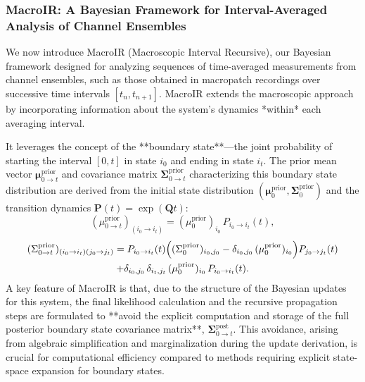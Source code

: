 \documentclass[9pt]{elife}
\begin{document}
	\subsubsection{MacroIR: A Bayesian Framework for Interval-Averaged Analysis of Channel Ensembles}
	
	We now introduce MacroIR (Macroscopic Interval Recursive), our Bayesian framework designed for analyzing sequences of time-averaged measurements from channel ensembles, such as those obtained in macropatch recordings over successive time intervals \([t_n, t_{n+1}]\). MacroIR extends the macroscopic approach by incorporating information about the system's dynamics *within* each averaging interval.
	
	It leverages the concept of the **boundary state**—the joint probability of starting the interval \([0, t]\) in state \(i_0\) and ending in state \(i_t\). The prior mean vector \(\boldsymbol{\mu}^{\text{prior}}_{0 \rightarrow t}\) and covariance matrix \(\boldsymbol{\Sigma}^{\text{prior}}_{0 \rightarrow t}\) characterizing this boundary state distribution are derived from the initial state distribution \((\boldsymbol{\mu}^{\text{prior}}_0, \boldsymbol{\Sigma}^{\text{prior}}_0)\) and the transition dynamics \(\mathbf{P}(t) = \exp(\boldsymbol{Q}t)\):
	\begin{equation}
		(\mu^{\text{prior}}_{0 \rightarrow t})_{(i_0 \rightarrow i_t)} = (\mu^{\text{prior}}_0)_{i_0} \, P_{i_0 \rightarrow i_t}(t),
		\label{eq:boundary_mean_prior}
	\end{equation}
	\begin{multline}
		(\Sigma^{\text{prior}}_{0 \rightarrow t})_{(i_0 \rightarrow i_t)(j_0 \rightarrow j_t)} = P_{i_0 \rightarrow i_t}(t)\Bigl((\Sigma^{\text{prior}}_0)_{i_0,j_0} - \delta_{i_0,j_0}\, (\mu^{\text{prior}}_0)_{i_0}\Bigr) P_{j_0 \rightarrow j_t}(t) \\
		+ \delta_{i_0,j_0}\,\delta_{i_t,j_t}\, (\mu^{\text{prior}}_0)_{i_0}\, P_{i_0 \rightarrow i_t}(t).
		\label{eq:boundary_covariance_prior}
	\end{multline}
	A key feature of MacroIR is that, due to the structure of the Bayesian updates for this system, the final likelihood calculation and the recursive propagation steps are formulated to **avoid the explicit computation and storage of the full posterior boundary state covariance matrix**, \(\boldsymbol{\Sigma}^{\text{post}}_{0 \rightarrow t}\). This avoidance, arising from algebraic simplification and marginalization during the update derivation, is crucial for computational efficiency compared to methods requiring explicit state-space expansion for boundary states.
	
\end{document}
